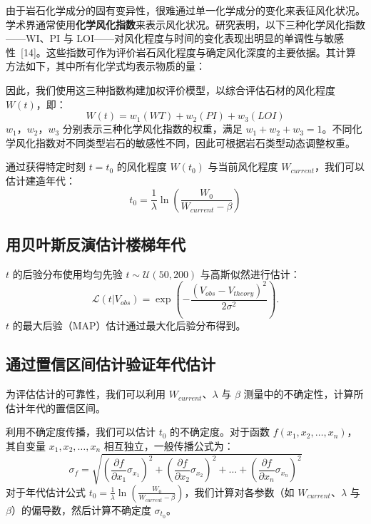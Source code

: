 \documentclass[11pt,a4paper]{ctexart}
\begin{document}
由于岩石化学成分的固有变异性，很难通过单一化学成分的变化来表征风化状况。学术界通常使用\textbf{化学风化指数}来表示风化状况。研究表明，以下三种化学风化指数——WI、PI 与 LOI——对风化程度与时间的变化表现出明显的单调性与敏感性\ [14]。这些指数可作为评价岩石风化程度与确定风化深度的主要依据。其计算方法如下，其中所有化学式均表示物质的量：

因此，我们使用这三种指数构建加权评价模型，以综合评估石材的风化程度 $W(t)$，即：
\begin{equation}
W(t)=w_1(WT)+w_2(PI)+w_3(LOI) \tag{25}
\end{equation}
$w_1$，$w_2$，$w_3$ 分别表示三种化学风化指数的权重，满足 $w_1+w_2+w_3=1$。不同化学风化指数对不同类型岩石的敏感性不同，因此可根据岩石类型动态调整权重。

通过获得特定时刻 $t=t_0$ 的风化程度 $W(t_0)$ 与当前风化程度 $W_{current}$，我们可以估计建造年代：
\begin{equation}
t_0=\frac{1}{\lambda}\ln\left(\frac{W_0}{W_{current}-\beta}\right) \tag{26}
\end{equation}

\subsection{用贝叶斯反演估计楼梯年代}

$t$ 的后验分布使用均匀先验 $t\sim\mathcal{U}(50,200)$ 与高斯似然进行估计：
\begin{equation}
\mathcal{L}(t|V_{obs})=\exp\left(-\frac{(V_{obs}-V_{theory})^2}{2\sigma^2}\right). \tag{27}
\end{equation}
$t$ 的最大后验（MAP）估计通过最大化后验分布得到。

\subsection{通过置信区间估计验证年代估计}

为评估估计的可靠性，我们可以利用 $W_{current}$、$\lambda$ 与 $\beta$ 测量中的不确定性，计算所估计年代的置信区间。

利用不确定度传播，我们可以估计 $t_0$ 的不确定度。对于函数 $f(x_1,x_2,\dots,x_n)$，其自变量 $x_1,x_2,\dots,x_n$ 相互独立，一般传播公式为：
\begin{equation}
\sigma_f=\sqrt{\left(\frac{\partial f}{\partial x_1}\sigma_{x_1}\right)^2+\left(\frac{\partial f}{\partial x_2}\sigma_{x_2}\right)^2+\dots+\left(\frac{\partial f}{\partial x_n}\sigma_{x_n}\right)^2} \tag{28}
\end{equation}
对于年代估计公式 $t_0=\frac{1}{\lambda}\ln\left(\frac{W_0}{W_{current}-\beta}\right)$，我们计算对各参数（如 $W_{current}$、$\lambda$ 与 $\beta$）的偏导数，然后计算不确定度 $\sigma_{t_0}$。
\end{document}
